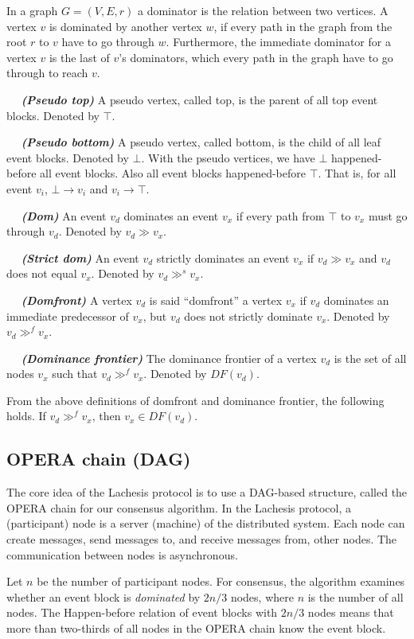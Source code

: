 \documentclass{article}
\newcommand{\dfnn}[2]{$\quad$ \textbf{\emph{(#1)}} {#2}}
\newcommand{\dom}{\gg}
\newcommand{\sdom}{\gg^{s}}
\newcommand{\domf}{\gg^{f}}
\newcommand{\hbefore}{\rightarrow}
\begin{document}
In a graph $G=(V, E, r)$ a dominator is the relation between two vertices. A vertex $v$ is dominated by another vertex $w$, if every path in the graph from the root $r$ to $v$ have to go through $w$. Furthermore, the immediate dominator for a vertex $v$ is the last of $v$’s dominators, which every path in the graph have to go through to reach $v$.


\dfnn{Pseudo top}{A pseudo vertex, called top, is the parent of all top event blocks. Denoted by $\top$.}

\dfnn{Pseudo bottom}{A pseudo vertex, called bottom, is the child of all leaf event blocks. Denoted by $\bot$.}
With the pseudo vertices, we have $\bot$ happened-before all event blocks. Also all event blocks happened-before $\top$. That is, for all event $v_i$, $\bot \hbefore v_i$ and $v_i \hbefore \top$.

\dfnn{Dom}{An event $v_d$ dominates an event $v_x$ if every path from $\top$ to $v_x$ must go through $v_d$. Denoted by $v_d \dom v_x$.}

\dfnn{Strict dom}{An event $v_d$ strictly dominates an event $v_x$ if $v_d \dom v_x$ and $v_d$ does not equal $v_x$. Denoted by $v_d \sdom v_x$.}

\dfnn{Domfront}{A vertex $v_d$ is said ``domfront'' a vertex $v_x$ if  $v_d$ dominates an immediate predecessor of $v_x$, but $v_d$ does not strictly dominate $v_x$. Denoted by $v_d \domf v_x$.}

\dfnn{Dominance frontier}{The dominance frontier of a vertex $v_d$ is the set of all nodes $v_x$ such that $v_d \domf v_x$. Denoted by $DF(v_d)$.}

From the above definitions of domfront and dominance frontier, the following holds. If $v_d \domf v_x$, then $v_x \in DF(v_d)$.
	 
\subsection{OPERA chain (DAG)}

The core idea of the Lachesis protocol is to use a DAG-based structure, called the OPERA chain for our consensus algorithm. 
In the Lachesis protocol, a (participant) node is a server (machine) of the distributed system.
Each node can create messages, send messages to, and receive messages from, other nodes. The communication between nodes is asynchronous. 

Let $n$ be the number of participant nodes.
For consensus, the algorithm examines whether an event block is \emph{dominated} by $2n/3$ nodes, where $n$ is the number of all nodes. The Happen-before relation of event blocks with $2n/3$ nodes means that more than two-thirds of all nodes in the OPERA chain know the event block. 
\end{document}
